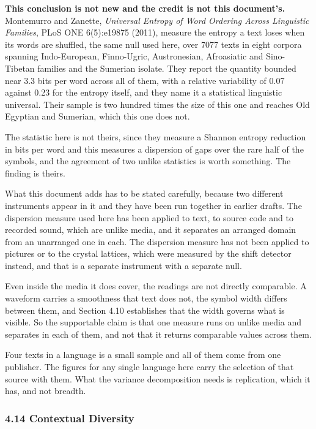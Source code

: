 \noindent\textbf{This conclusion is not new and the credit is not this document's.} Montemurro and Zanette, \emph{Universal Entropy of Word Ordering Across Linguistic Families}, PLoS ONE 6(5):e19875 (2011), measure the entropy a text loses when its words are shuffled, the same null used here, over 7077 texts in eight corpora spanning Indo-European, Finno-Ugric, Austronesian, Afroasiatic and Sino-Tibetan families and the Sumerian isolate. They report the quantity bounded near 3.3 bits per word across all of them, with a relative variability of 0.07 against 0.23 for the entropy itself, and they name it a statistical linguistic universal. Their sample is two hundred times the size of this one and reaches Old Egyptian and Sumerian, which this one does not.

The statistic here is not theirs, since they measure a Shannon entropy reduction in bits per word and this measures a dispersion of gaps over the rare half of the symbols, and the agreement of two unlike statistics is worth something. The finding is theirs.

What this document adds has to be stated carefully, because two different instruments appear in it and they have been run together in earlier drafts. The dispersion measure used here has been applied to text, to source code and to recorded sound, which are unlike media, and it separates an arranged domain from an unarranged one in each. The dispersion measure has not been applied to pictures or to the crystal lattices, which were measured by the shift detector instead, and that is a separate instrument with a separate null.

Even inside the media it does cover, the readings are not directly comparable. A waveform carries a smoothness that text does not, the symbol width differs between them, and Section 4.10 establishes that the width governs what is visible. So the supportable claim is that one measure runs on unlike media and separates in each of them, and not that it returns comparable values across them.

Four texts in a language is a small sample and all of them come from one publisher. The figures for any single language here carry the selection of that source with them. What the variance decomposition needs is replication, which it has, and not breadth.

\subsubsection{4.14 Contextual Diversity}

